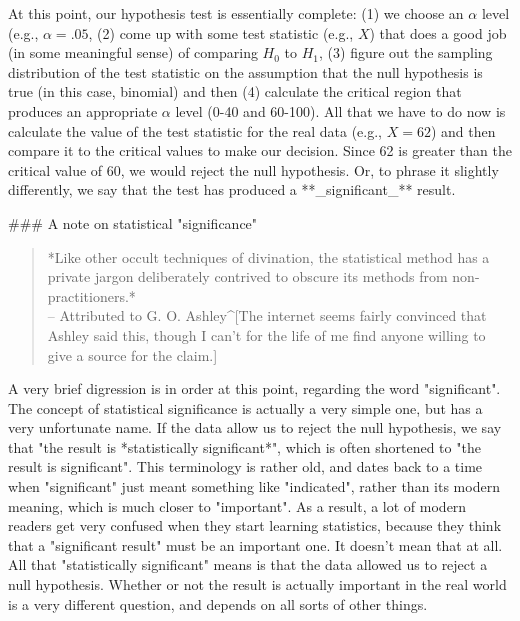 At this point, our hypothesis test is essentially complete: (1) we choose an $\alpha$ level (e.g., $\alpha = .05$, (2) come up with some test statistic (e.g., $X$) that does a good job (in some meaningful sense) of comparing $H_0$ to $H_1$, (3) figure out the sampling distribution of the test statistic on the assumption that the null hypothesis is true (in this case, binomial) and then (4) calculate the critical region that produces an appropriate $\alpha$ level (0-40 and 60-100). All that we have to do now is calculate the value of the test statistic for the real data (e.g., $X = 62$) and then compare it to the critical values to make our decision. Since 62 is greater than the critical value of 60, we would reject the null hypothesis. Or, to phrase it slightly differently, we say that the test has produced a **_significant_** result. 



### A note on statistical "significance"

\begin{quote}
*Like other occult techniques of divination, the statistical method has a private jargon deliberately contrived to obscure its methods from non-practitioners.* \\
\hspace*{2cm} -- Attributed to G. O. Ashley^[The internet seems fairly convinced that Ashley said this, though I can't for the life of me find anyone willing to give a source for the claim.]
\end{quote}


A very brief digression is in order at this point, regarding the word "significant". The concept of statistical significance is actually a very simple one, but has a very unfortunate name. If the data allow us to reject the null hypothesis, we say that "the result is *statistically significant*", which is often shortened to "the result is significant". This terminology is rather old, and dates back to a time when "significant" just meant something like "indicated", rather than its modern meaning, which is much closer to "important". As a result, a lot of modern readers get very confused when they start learning statistics, because they think that a "significant result" must be an important one. It doesn't mean that at all. All that "statistically significant" means is that the data allowed us to reject a null hypothesis. Whether or not the result is actually important in the real world is a very different question, and depends on all sorts of other things. 


